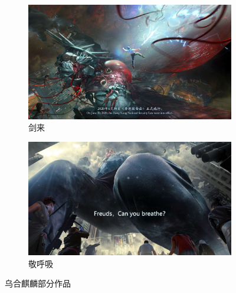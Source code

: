 \documentclass[zihao = -4, linespread = 1.5]{ctexart}
\begin{document}
\begin{figure}[htbp]
     \begin{subfigure}[b]{.5\linewidth - 1mm}
         \centering
         \includegraphics[width=\textwidth]{picture/剑来.jpg}
         \caption{剑来}
         \label{fig:JianLai}
     \end{subfigure}
     \hfill
     \begin{subfigure}[b]{.5\linewidth - 1mm}
         \centering
         \includegraphics[width=\textwidth]{picture/敬呼吸.jpg}
         \caption{敬呼吸}
         \label{fig:JingHuXi}
     \end{subfigure}

        \caption{乌合麒麟部分作品}
        \label{fig:WuHeQiLin}
\end{figure}



\clearpage
\end{document}
